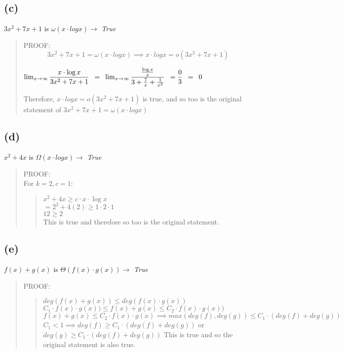 \documentclass[12pt]{article}%
\begin{document}
\subsection*{(c)}
$3x^2 +7x + 1$ is $\omega(x\cdot logx) \xrightarrow{}$ \textit{True} \\
\begin{quote}
PROOF:\\
$$3x^2 +7x + 1 = \omega(x\cdot logx) \implies x\cdot logx = o(3x^2 +7x + 1)$$
\begin{center}
    $\lim_{x \to \infty} \dfrac{x\cdot \log x}{3x^2 + 7x +1} \hspace{5px}  =\hspace{5px}\lim_{x \to \infty} \dfrac{\frac{\log x}{x}}{3 + \frac{7}{x} + \frac{1}{x^2}}\hspace{5px} = \dfrac{0}{3} \hspace{5px}=\hspace{5px} 0$
\end{center}
Therefore, $x\cdot logx = o(3x^2 +7x + 1)$ is true, and so too is the original statement of $3x^2 +7x + 1 = \omega(x\cdot logx) $
\end{quote}
\subsection*{(d)}
$x^2 +4x$ is $\Omega(x \cdot logx) \xrightarrow{}$ \textit{True} \\
\begin{quote}
PROOF:\\


\skip
For $k=2,c=1$:\\
\begin{quote}
$x^2 + 4x \geq c \cdot x \cdot \log x$\\
$= 2^2 + 4(2) \geq 1 \cdot 2 \cdot 1$\\
$12 \geq 2$\\
This is true and therefore so too is the original statement.
\end{quote}
\end{quote}
\subsection*{(e)}
$f(x) + g(x)$ is $\Theta (f(x)\cdot g(x)) \xrightarrow{}$ \textit{True} \\
\begin{quote}
PROOF:\\
\begin{quote}
    $deg(f(x)+g(x)) \leq deg(f(x)\cdot g(x))$\\
    $C_1\cdot f(x)\cdot g(x)) \leq  f(x) + g(x) \leq C_2\cdot f(x)\cdot g(x))$\\
    $f(x) + g(x) \leq C_2\cdot f(x)\cdot g(x) \implies max(deg(f),deg(g)) \leq C_1\cdot(deg(f)+deg(g))$\\
    $C_1 < 1 \implies deg(f) \geq C_1\cdot(deg(f)+deg(g))$ or $deg(g) \geq C_1\cdot(deg(f)+deg(g))$
    This is true and so the original statement is also true.
\end{quote}
\end{quote}
\newpage
\end{document}
